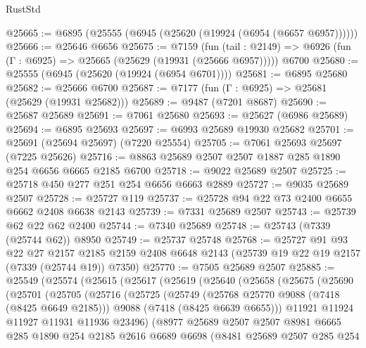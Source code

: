 \begin{lexlean}{RustStd}
\begin{coremodule}
@25665 := @6895 (@25555 (@6945 (@25620 (@19924 (@6954 (@6657 @6957))))))
@25666 := @25646 @6656
@25675 := @7159
    (fun (tail : @2149) => @6926 (fun (Γ : @6925) => @25665 (@25629 (@19931 (@25666 @6957)))))
    @6700
@25680 := @25555 (@6945 (@25620 (@19924 (@6954 @6701))))
@25681 := @6895 @25680
@25682 := @25666 @6700
@25687 := @7177 (fun (Γ : @6925) => @25681 (@25629 (@19931 @25682)))
@25689 := @9487 (@7201 @8687)
@25690 := @25687 @25689
@25691 := @7061 @25680
@25693 := @25627 (@6986 @25689)
@25694 := @6895 @25693
@25697 := @6993 @25689 @19930 @25682
@25701 := @25691 (@25694 @25697) (@7220 @25554)
@25705 := @7061 @25693 @25697 (@7225 @25626)
@25716 := @8863 @25689 @2507 @2507 @1887 @285 @1890 @254 @6656 @6665 @2185 @6700
@25718 := @9022 @25689 @2507
@25725 := @25718 @450 @277 @251 @254 @6656 @6663 @2889
@25727 := @9035 @25689 @2507
@25728 := @25727 @119
@25737 := @25728 @94 @22 @73 @2400 @6655 @6662 @2408 @6638 @2143
@25739 := @7331 @25689 @2507
@25743 := @25739 @62 @22 @62 @2400
@25744 := @7340 @25689
@25748 := @25743 (@7339 (@25744 @62)) @8950
@25749 := @25737 @25748
@25768 := @25727
    @91
    @93
    @22
    @27
    @2157
    @2185
    @2159
    @2408
    @6648
    @2143
    (@25739 @19 @22 @19 @2157 (@7339 (@25744 @19)) @7350)
@25770 := @7505 @25689 @2507
@25885 := @25549
    (@25574
      (@25615
        (@25617
          (@25619
            (@25640
              (@25658
                (@25675
                  (@25690
                    (@25701
                      (@25705
                        (@25716
                          (@25725
                            (@25749
                              (@25768 @25770 @9088 (@7418 (@8425 @6649 @2185)))
                              @9088
                              (@7418 (@8425 @6639 @6655)))
                            @11921
                            @11924
                            @11927
                            @11931
                            @11936
                            @23496)
                          (@8977
                            @25689
                            @2507
                            @2507
                            @8981
                            @6665
                            @285
                            @1890
                            @254
                            @2185
                            @2616
                            @6689
                            @6698
                            (@8481
                              @25689
                              @2507
                              @285
                              @254

\end{coremodule}
\end{lexlean}
